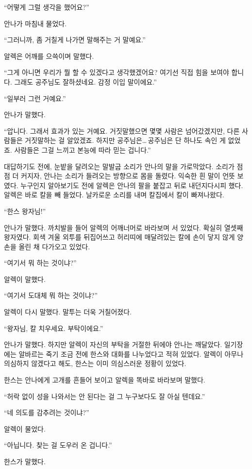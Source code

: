 ``어떻게 그럴 생각을 했어요?''

안나가 마침내 물었다.

``그러니까, 좀 거칠게 나가면 말해주는 거 말예요.''

알렉은 어깨를 으쓱이며 말했다.

``그게 아니면 우리가 뭘 할 수 있겠다고 생각했겠어요? 여기선 직접 힘을 보여야 합니다. 그래도 공주님도 잘하셨네요. 감정 이입 말이에요.''

``일부러 그런 거예요.''

안나가 말했다.

``압니다. 그래서 효과가 있는 거예요. 거짓말했으면 몇몇 사람은 넘어갔겠지만, 다른 사람들은 거짓말하는 걸 알았겠죠. 하지만 공주님은\ldots\,공주님은 단 하나도 속인 게 없었죠. 사람들은 그걸 느끼고 본능에 따라 믿는 겁니다.''

대답하기도 전에, 눈밭을 달려오는 말발굽 소리가 안나의 말을 가로막았다. 소리가 점점 더 커지자, 안나는 소리가 들려오는 방향으로 몸을 돌렸다. 익숙한 흰 말이 언뜻 보였다. 누구인지 알아보기도 전에 알렉은 안나의 팔을 붙잡고 뒤로 내던지다시피 했다. 알렉은 바로 칼을 빼 들었다. 날카로운 소리를 내며 칼집에서 칼이 빠져나왔다.

``한스 왕자님!''

안나가 말했다. 까치발을 들어 알렉의 어깨너머로 바라보며 서 있었다. 확실히 열셋째 왕자였다. 회색 겨울 외투를 뒤집어쓰고 허리띠에 매달려있는 칼에 손이 닿지 않게 양손을 올린 채 다가오고 있었다.

``여기서 뭐 하는 것이냐?''

알렉이 말했다.

``여기서 도대체 뭐 하는 것이냐?''

알렉이 다시 말했다. 말투는 더욱 거칠어졌다.

``왕자님, 칼 치우세요. 부탁이에요.''

안나가 말했다. 하지만 알렉이 자신의 부탁을 거절한 뒤에야 안나는 깨달았다. 일기장에는 알바르는 죽기 조금 전에 한스와 대화를 나누었다고 적혀 있었다. 알렉이 아무나 의심하지 않겠다고 해도, 한스는 이미 의심스러운 정황이 있었다.

한스는 안나에게 고개를 흔들어 보이고 알렉을 똑바로 바라보며 말했다.

``허락 없이 성을 나와서는 안 된다는 걸 그 누구보다도 잘 아실 텐데요.''

``네 의도를 감추려는 것이냐?''

알렉이 물었다.

``아닙니다. 찾는 걸 도우러 온 겁니다.''

한스가 말했다.

